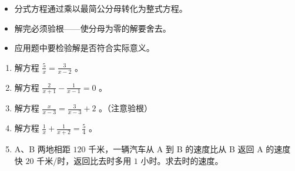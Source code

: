 \begin{keytakeaway}


\begin{itemize}
  \item 分式方程通过乘以最简公分母转化为整式方程。
  \item 解完必须验根——使分母为零的解要舍去。
  \item 应用题中要检验解是否符合实际意义。
\end{itemize}


\end{keytakeaway}

\begin{practice}


\begin{enumerate}
  \item 解方程 $\frac{5}{x} = \frac{3}{x - 2}$ 。
  \item 解方程 $\frac{2}{x + 1} - \frac{1}{x - 1} = 0$ 。
  \item 解方程 $\frac{x}{x - 3} = \frac{3}{x - 3} + 2$ 。（注意验根）
  \item 解方程 $\frac{1}{x} + \frac{1}{x + 2} = \frac{5}{4}$ 。
  \item A、B 两地相距 $120$ 千米，一辆汽车从 A 到 B 的速度比从 B 返回 A 的速度快 $20$ 千米/时，返回比去时多用 $1$ 小时。求去时的速度。
\end{enumerate}


\end{practice}



